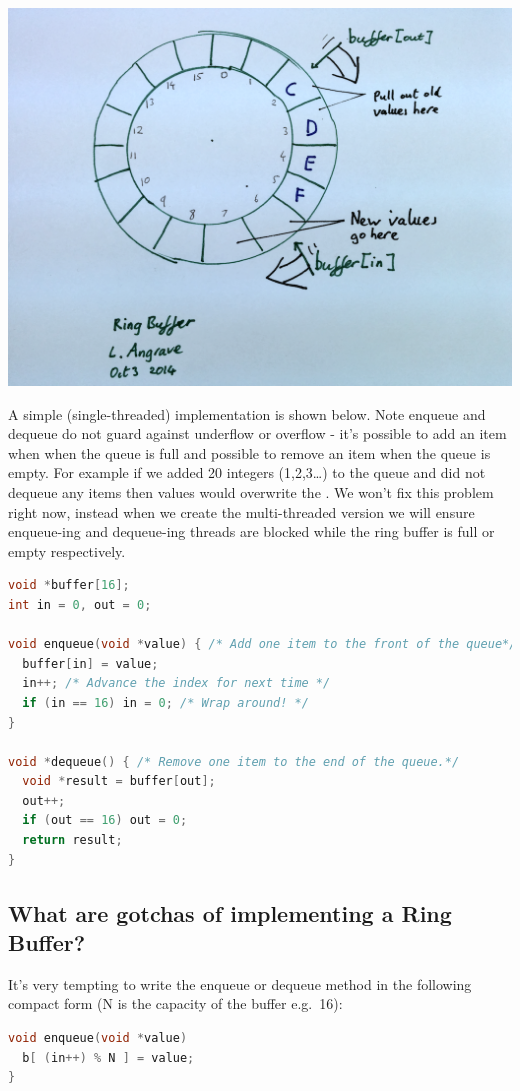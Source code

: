 \begin{center}
\includegraphics[width=.5\textwidth]{synchronization/images/ring_buffer.png}
\end{center}

A simple (single-threaded) implementation is shown below. Note enqueue and dequeue do not guard against underflow or overflow - it's possible to add an item when when the queue is full and possible to remove an item when the queue is empty. For example if we added 20 integers (1,2,3\ldots{}) to the queue and did not dequeue any items then values  would overwrite the . We won't fix this problem right now, instead when we create the multi-threaded version we will ensure enqueue-ing and dequeue-ing threads are blocked while the ring buffer is full or empty respectively.

\begin{lstlisting}[language=C]
void *buffer[16];
int in = 0, out = 0;

void enqueue(void *value) { /* Add one item to the front of the queue*/
  buffer[in] = value;
  in++; /* Advance the index for next time */
  if (in == 16) in = 0; /* Wrap around! */
}

void *dequeue() { /* Remove one item to the end of the queue.*/
  void *result = buffer[out];
  out++;
  if (out == 16) out = 0;
  return result;
}
\end{lstlisting}

\subsection{What are gotchas of implementing a Ring Buffer?}\label{what-are-gotchas-of-implementing-a-ring-buffer}

It's very tempting to write the enqueue or dequeue method in the following compact form (N is the capacity of the buffer e.g.~16):

\begin{lstlisting}[language=C]
void enqueue(void *value)
  b[ (in++) % N ] = value;
}
\end{lstlisting}

